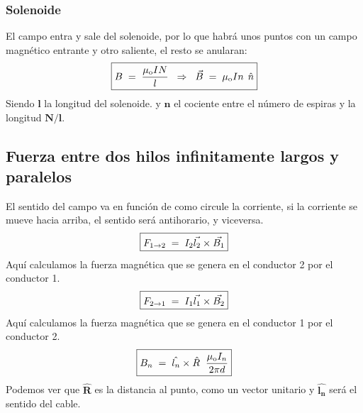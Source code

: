 \subsubsection{Solenoide}
\noindent El campo entra y sale del solenoide, por lo que habrá unos puntos con un campo magnético entrante y otro saliente, el resto se anularan:
\[
        \boxed{B \hspace{1mm}=\hspace{1mm} \frac{\mu_{\textnormal{o}}IN}{l}\hspace{2mm}\Rightarrow \hspace{2mm}\vec{B}\hspace{1mm}=\hspace{1mm}\mu_\textnormal{o}In \hspace{1.5mm}\hat{n}}\]
Siendo \(\mathbf{l}\) la longitud del solenoide. y \(\mathbf{n}\) el cociente entre el número de espiras y la longitud \(\mathbf{N/l}\).
\subsection{Fuerza entre dos hilos infinitamente largos y paralelos}
El sentido del campo va en función de como circule la corriente, si la corriente se mueve hacia arriba, el sentido será antihorario, y viceversa.
\[
        \boxed{F_{1\rightarrow 2} \hspace{1mm} = \hspace{1mm} I_2\vec{l_2} \times\vec{B_1}}
\]
\noindent Aquí calculamos la fuerza magnética que se genera en el conductor 2 por el conductor 1.
\[
        \boxed{F_{2\rightarrow 1} \hspace{1mm} = \hspace{1mm} I_1\vec{l_1} \times\vec{B_2}}
\]
\noindent Aquí calculamos la fuerza magnética que se genera en el conductor 1 por el conductor 2.
\[
        \boxed{B_n \hspace{1mm} = \hspace{1mm}\hat{l_n}\times\hat{R}\hspace{2mm}\frac{\mu_{\textnormal{o}}I_n}{2\pi d}}
\]
\noindent Podemos ver que \(\mathbf{\hat{R}}\) es la distancia al punto, como un vector unitario y \(\mathbf{\hat{l_n}}\) será el sentido del cable.